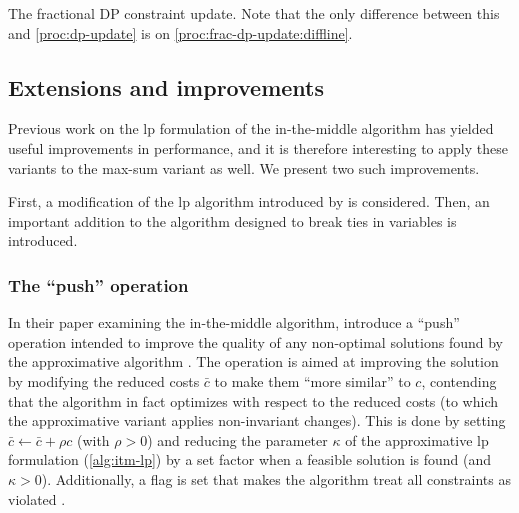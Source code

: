 \begin{algorithm}[tbp]
	
	\caption{
		The fractional DP constraint update. Note that the only difference between this and \cref{proc:dp-update} is on \cref{proc:frac-dp-update:diffline}.
	}
	\label{proc:frac-dp-update}
\end{algorithm}


\subsection{Extensions and improvements}
Previous work on the \gls{lp} formulation of the in-the-middle algorithm has yielded useful improvements in performance, and it is therefore interesting to apply these variants to the max-sum variant as well.
We present two such improvements.

First, a modification of the \gls{lp} algorithm introduced by \textcite{Bastert10} is considered.
Then, an important addition to the algorithm designed to break ties in variables is introduced.

\subsubsection{The \enquote{push} operation}
In their paper examining the in-the-middle algorithm, \textcite{Bastert10} introduce a \enquote{push} operation intended to improve the quality of any non-optimal solutions found by the approximative algorithm \parencite[\pno~99\psq]{Bastert10}.
The operation is aimed at improving the solution by modifying the reduced costs \(\bar{c}\) to make them \enquote{more similar} to \(c\), contending that the algorithm in fact optimizes with respect to the reduced costs (to which the approximative variant applies non-invariant changes).
This is done by setting \(\bar{c}\leftarrow\bar{c}+\rho c\) (with \(\rho>0\)) and reducing the parameter \(\kappa\) of the approximative \gls{lp} formulation (\cref{alg:itm-lp}) by a set factor when a feasible solution is found (and \(\kappa>0\)).
Additionally, a flag is set that makes the algorithm treat all constraints as violated \parencite[\pno~100]{Bastert10}.

